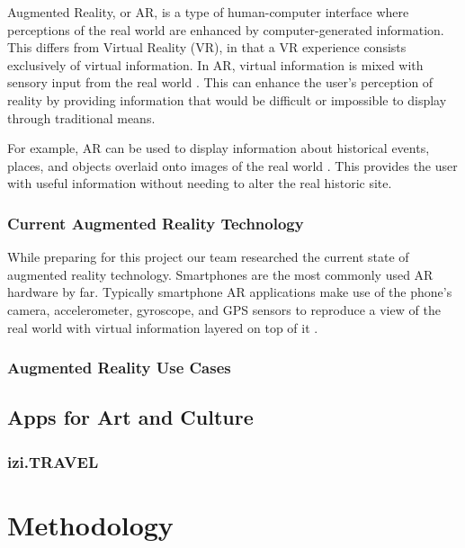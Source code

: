 \documentclass[a4paper, 10pt, american]{article}
\begin{document}
Augmented Reality, or AR, is a type of human-computer interface where
perceptions of the real world are enhanced by computer-generated information.
This differs from Virtual Reality (VR), in that a VR experience consists
exclusively of virtual information. In AR, virtual information is mixed with
sensory input from the real world \cite{carmigniani2011}. This can enhance the
user's perception of reality by providing information that would be difficult or
impossible to display through traditional means.

For example, AR can be used to display information about historical events,
places, and objects overlaid onto images of the real world \cite{saenz2009}.
This provides the user with useful information without needing to alter the real
historic site.

\subsubsection{Current Augmented Reality Technology}
\label{sec:currentAugmentedRealityTechnology}

While preparing for this project our team researched the current state of
augmented reality technology. Smartphones are the most commonly used AR hardware
by far. Typically smartphone AR applications make use of the phone's camera,
accelerometer, gyroscope, and GPS sensors to reproduce a view of the real world
with virtual information layered on top of it \cite{bonsor2018}.

\subsubsection{Augmented Reality Use Cases}
\label{sec:augmentedRealityUseCases}

\lipsum[1]

\subsection{Apps for Art and Culture}
\label{sec:appsForArtAndCulture}

\lipsum[2-3]

\subsubsection{izi.TRAVEL}
\label{sec:iziTravel}

\lipsum[4-5]

\section{Methodology}
\label{sec:methodology}
\end{document}
